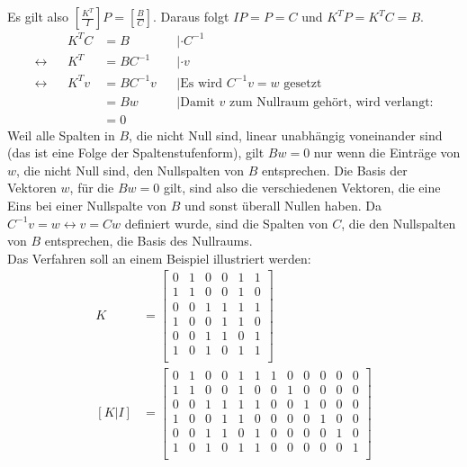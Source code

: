\documentclass[a4paper,10pt,ngerman]{scrartcl}
\begin{document}
Es gilt also $\left[\frac{K^T}{I}\right] P = \left[\frac{B}{C}\right]$. Daraus folgt $I P = P = C$ und $K^T P = K^T C = B$.
\begin{align*}
&& K^T C &= B  &&|\cdot C^{-1}\\
\leftrightarrow && K^T &= BC^{-1} &&|\cdot v \\
\leftrightarrow && K^T v &= BC^{-1} v && | \text{Es wird $C^{-1}v = w$ gesetzt}\\
&& &= Bw && | \text{Damit $v$ zum Nullraum gehört, wird verlangt:}\\
&& &= 0 
\end{align*}
Weil alle Spalten in $B$, die nicht Null sind, linear unabhängig voneinander sind (das ist eine Folge der Spaltenstufenform), gilt $Bw=0$ nur wenn die Einträge von $w$, die nicht Null sind, den Nullspalten von $B$ entsprechen. Die Basis der Vektoren $w$, für die $Bw=0$ gilt, sind also die verschiedenen Vektoren, die eine Eins bei einer Nullspalte von $B$ und sonst überall Nullen haben. Da $C^{-1} v = w \leftrightarrow v = C w$ definiert wurde, sind die Spalten von $C$, die den Nullspalten von $B$ entsprechen, die Basis des Nullraums. \\
Das Verfahren soll an einem Beispiel illustriert werden:
\begin{align*}
K &= \left[ \begin{array}{cccccc}
0 & 1 & 0 & 0 & 1 & 1 \\
1 & 1 & 0 & 0 & 1 & 0 \\
0 & 0 & 1 & 1 & 1 & 1 \\
1 & 0 & 0 & 1 & 1 & 0 \\
0 & 0 & 1 & 1 & 0 & 1 \\
1 & 0 & 1 & 0 & 1 & 1 \\
\end{array} \right] \\
[K | I] &= \left[ \begin{array}{cccccc|cccccc}
0 & 1 & 0 & 0 & 1 & 1 & 1 & 0 & 0 & 0 & 0 & 0 \\
1 & 1 & 0 & 0 & 1 & 0 & 0 & 1 & 0 & 0 & 0 & 0 \\
0 & 0 & 1 & 1 & 1 & 1 & 0 & 0 & 1 & 0 & 0 & 0 \\
1 & 0 & 0 & 1 & 1 & 0 & 0 & 0 & 0 & 1 & 0 & 0 \\
0 & 0 & 1 & 1 & 0 & 1 & 0 & 0 & 0 & 0 & 1 & 0 \\
1 & 0 & 1 & 0 & 1 & 1 & 0 & 0 & 0 & 0 & 0 & 1 \\
\end{array} \right]
\end{align*} 
\end{document}
